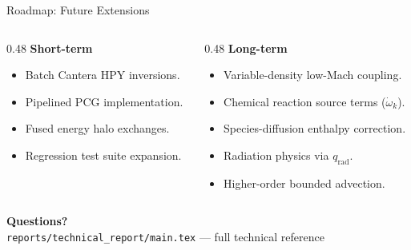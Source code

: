 \documentclass[aspectratio=169,11pt]{beamer}
\begin{document}
\begin{frame}{Roadmap: Future Extensions}
  \begin{columns}[T,totalwidth=\textwidth]
    \begin{column}{0.48\textwidth}
      \textbf{Short-term}
      \begin{itemize}
        \item Batch Cantera HPY inversions.
        \item Pipelined PCG implementation.
        \item Fused energy halo exchanges.
        \item Regression test suite expansion.
      \end{itemize}
    \end{column}
    \begin{column}{0.48\textwidth}
      \textbf{Long-term}
      \begin{itemize}
        \item Variable-density low-Mach coupling.
        \item Chemical reaction source terms ($\dot{\omega}_k$).
        \item Species-diffusion enthalpy correction.
        \item Radiation physics via $q_{\mathrm{rad}}$.
        \item Higher-order bounded advection.
      \end{itemize}
    \end{column}
  \end{columns}
\end{frame}

\begin{frame}
  \centering
  \Large\textbf{Questions?}\\[1em]
  \normalsize\texttt{reports/technical\_report/main.tex} --- full technical reference
\end{frame}
\end{document}
